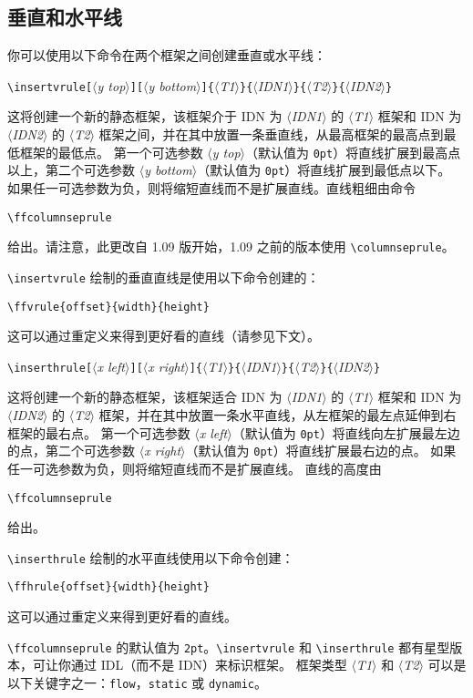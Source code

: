 \documentclass[a4paper]{book}%
\newcommand{\meta}[1]{\textnormal{\ensuremath{\langle}\makebox[0pt][l]{}\emph{#1}\makebox[0pt][l]{}\ensuremath{\rangle}}}
\newcommand{\cmd}[1]{\texttt{#1}}
\begin{document}
\subsection{垂直和水平线}\label{sec-5-4-4}%
你可以使用以下命令在两个框架之间创建垂直或水平线：
\begin{mdframed}
    \verb|\insertvrule[|\meta{y top}\verb|][|\meta{y bottom}\verb|]{|\meta{T1}\verb|}{|\meta{IDN1}\verb|}{|\meta{T2}\verb|}{|\meta{IDN2}\verb|}|
\end{mdframed}
这将创建一个新的静态框架，该框架介于 IDN 为 \meta{IDN1} 的 \meta{T1} 框架和 IDN 为 \meta{IDN2} 的 \meta{T2} 框架之间，并在其中放置一条垂直线，从最高框架的最高点到最低框架的最低点。 第一个可选参数 \meta{y top}（默认值为 \cmd{0pt}）将直线扩展到最高点以上，第二个可选参数 \meta{y bottom}（默认值为 \cmd{0pt}）将直线扩展到最低点以下。 如果任一可选参数为负，则将缩短直线而不是扩展直线。直线粗细由命令
\begin{mdframed}
    \verb|\ffcolumnseprule|
\end{mdframed}
给出。请注意，此更改自 1.09 版开始，1.09 之前的版本使用 \verb|\columnseprule|。

\verb|\insertvrule| 绘制的垂直直线是使用以下命令创建的：
\begin{mdframed}
    \verb|\ffvrule{offset}{width}{height}|
\end{mdframed}
这可以通过重定义来得到更好看的直线（请参见下文）。
\begin{mdframed}
    \verb|\inserthrule[|\meta{x left}\verb|][|\meta{x right}\verb|]{|\meta{T1}\verb|}{|\meta{IDN1}\verb|}{|\meta{T2}\verb|}{|\meta{IDN2}\verb|}|
\end{mdframed}
这将创建一个新的静态框架，该框架适合 IDN 为 \meta{IDN1} 的 \meta{T1} 框架和 IDN 为 \meta{IDN2} 的 \meta{T2} 框架，并在其中放置一条水平直线，从左框架的最左点延伸到右框架的最右点。 第一个可选参数 \meta{x left}（默认值为 \cmd{0pt}）将直线向左扩展最左边的点，第二个可选参数 \meta{x right}（默认值为 \cmd{0pt}）将直线扩展最右边的点。 如果任一可选参数为负，则将缩短直线而不是扩展直线。 直线的高度由
\begin{mdframed}
    \verb|\ffcolumnseprule|
\end{mdframed}
给出。

\verb|\inserthrule| 绘制的水平直线使用以下命令创建：
\begin{mdframed}
    \verb|\ffhrule{offset}{width}{height}|
\end{mdframed}
这可以通过重定义来得到更好看的直线。

\verb|\ffcolumnseprule| 的默认值为 \cmd{2pt}。\verb|\insertvrule| 和 \verb|\inserthrule| 都有星型版本，可让你通过 IDL（而不是 IDN）来标识框架。 框架类型 \meta{T1} 和 \meta{T2} 可以是以下关键字之一：\cmd{flow}，\cmd{static} 或 \cmd{dynamic}。
\end{document}
